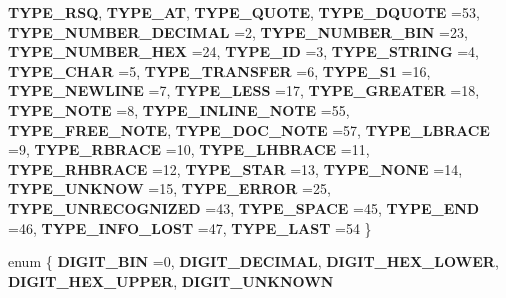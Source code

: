 \begin{DoxyCompactItemize}
{\bfseries T\+Y\+P\+E\+\_\+\+R\+SQ}, 
{\bfseries T\+Y\+P\+E\+\_\+\+AT}, 
{\bfseries T\+Y\+P\+E\+\_\+\+Q\+U\+O\+TE}, 
\newline
{\bfseries T\+Y\+P\+E\+\_\+\+D\+Q\+U\+O\+TE} =53, 
{\bfseries T\+Y\+P\+E\+\_\+\+N\+U\+M\+B\+E\+R\+\_\+\+D\+E\+C\+I\+M\+AL} =2, 
{\bfseries T\+Y\+P\+E\+\_\+\+N\+U\+M\+B\+E\+R\+\_\+\+B\+IN} =23, 
{\bfseries T\+Y\+P\+E\+\_\+\+N\+U\+M\+B\+E\+R\+\_\+\+H\+EX} =24, 
\newline
{\bfseries T\+Y\+P\+E\+\_\+\+ID} =3, 
{\bfseries T\+Y\+P\+E\+\_\+\+S\+T\+R\+I\+NG} =4, 
{\bfseries T\+Y\+P\+E\+\_\+\+C\+H\+AR} =5, 
{\bfseries T\+Y\+P\+E\+\_\+\+T\+R\+A\+N\+S\+F\+ER} =6, 
\newline
{\bfseries T\+Y\+P\+E\+\_\+\+S1} =16, 
{\bfseries T\+Y\+P\+E\+\_\+\+N\+E\+W\+L\+I\+NE} =7, 
{\bfseries T\+Y\+P\+E\+\_\+\+L\+E\+SS} =17, 
{\bfseries T\+Y\+P\+E\+\_\+\+G\+R\+E\+A\+T\+ER} =18, 
\newline
{\bfseries T\+Y\+P\+E\+\_\+\+N\+O\+TE} =8, 
{\bfseries T\+Y\+P\+E\+\_\+\+I\+N\+L\+I\+N\+E\+\_\+\+N\+O\+TE} =55, 
{\bfseries T\+Y\+P\+E\+\_\+\+F\+R\+E\+E\+\_\+\+N\+O\+TE}, 
{\bfseries T\+Y\+P\+E\+\_\+\+D\+O\+C\+\_\+\+N\+O\+TE} =57, 
\newline
{\bfseries T\+Y\+P\+E\+\_\+\+L\+B\+R\+A\+CE} =9, 
{\bfseries T\+Y\+P\+E\+\_\+\+R\+B\+R\+A\+CE} =10, 
{\bfseries T\+Y\+P\+E\+\_\+\+L\+H\+B\+R\+A\+CE} =11, 
{\bfseries T\+Y\+P\+E\+\_\+\+R\+H\+B\+R\+A\+CE} =12, 
\newline
{\bfseries T\+Y\+P\+E\+\_\+\+S\+T\+AR} =13, 
{\bfseries T\+Y\+P\+E\+\_\+\+N\+O\+NE} =14, 
{\bfseries T\+Y\+P\+E\+\_\+\+U\+N\+K\+N\+OW} =15, 
{\bfseries T\+Y\+P\+E\+\_\+\+E\+R\+R\+OR} =25, 
\newline
{\bfseries T\+Y\+P\+E\+\_\+\+U\+N\+R\+E\+C\+O\+G\+N\+I\+Z\+ED} =43, 
{\bfseries T\+Y\+P\+E\+\_\+\+S\+P\+A\+CE} =45, 
{\bfseries T\+Y\+P\+E\+\_\+\+E\+ND} =46, 
{\bfseries T\+Y\+P\+E\+\_\+\+I\+N\+F\+O\+\_\+\+L\+O\+ST} =47, 
\newline
{\bfseries T\+Y\+P\+E\+\_\+\+L\+A\+ST} =54
 \}
\item 
\mbox{\label{classx2_1_1_lexical_parser_a7bed4bbbaccf1d7d64acefd646ac3fca}} 
enum \{ \newline
{\bfseries D\+I\+G\+I\+T\+\_\+\+B\+IN} =0, 
{\bfseries D\+I\+G\+I\+T\+\_\+\+D\+E\+C\+I\+M\+AL}, 
{\bfseries D\+I\+G\+I\+T\+\_\+\+H\+E\+X\+\_\+\+L\+O\+W\+ER}, 
{\bfseries D\+I\+G\+I\+T\+\_\+\+H\+E\+X\+\_\+\+U\+P\+P\+ER}, 
\newline
{\bfseries D\+I\+G\+I\+T\+\_\+\+U\+N\+K\+N\+O\+WN}

\end{DoxyCompactItemize}

